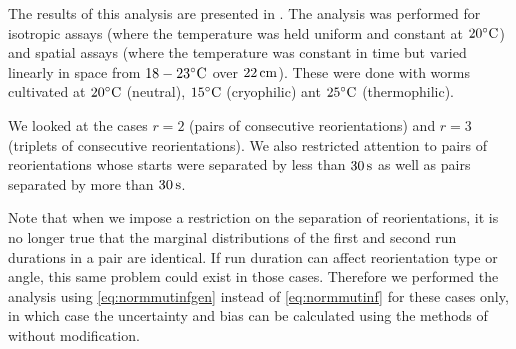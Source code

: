 \documentclass[12pt]{article}
\begin{document}
The results of this analysis are presented in . The analysis was performed for isotropic assays (where the temperature was held uniform and constant at $20^\circ\mathrm{C}$) and spatial assays (where the temperature was constant in time but varied linearly in space from $18-23^\circ\mathrm{C}$ over $22\,\mathrm{cm}$). These were done with worms cultivated at $20^\circ\mathrm{C}$ (neutral), $15^\circ\mathrm{C}$ (cryophilic) ant $25^\circ\mathrm{C}$ (thermophilic).

We looked at the cases $r=2$ (pairs of consecutive reorientations) and $r=3$ (triplets of consecutive reorientations). We also restricted attention to pairs of reorientations whose starts were separated by less than $30\,\mathrm{s}$ as well as pairs separated by more than $30\,\mathrm{s}$.


Note that when we impose a restriction on the separation of reorientations, it is no longer true that the marginal distributions of the first and second run durations in a pair are identical. If run duration can affect reorientation type or angle, this same problem could exist in those cases. Therefore we performed the analysis using \eqref{eq:normmutinfgen} instead of \eqref{eq:normmutinf} for these cases only, in which case the uncertainty and bias can be calculated using the methods of \cite{Roulston1999} without modification.

\end{document}
